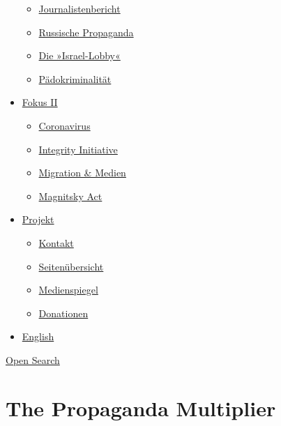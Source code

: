 \begin{itemize}
  \begin{itemize}
  \tightlist
  \item
    \href{https://swprs.org/bericht-eines-journalisten/}{Journalistenbericht}
  \item
    \href{https://swprs.org/russische-propaganda/}{Russische Propaganda}
  \item
    \href{https://swprs.org/die-israel-lobby-fakten-und-mythen/}{Die
    »Israel-Lobby«}
  \item
    \href{https://swprs.org/geopolitik-und-paedokriminalitaet/}{Pädokriminalität}
  \end{itemize}
\item
  \href{https://swprs.org/migration-und-medien/}{Fokus II}

  \begin{itemize}
  \tightlist
  \item
    \href{https://swprs.org/covid-19-hinweis-ii/}{Coronavirus}
  \item
    \href{https://swprs.org/die-integrity-initiative/}{Integrity
    Initiative}
  \item
    \href{https://swprs.org/migration-und-medien/}{Migration \& Medien}
  \item
    \href{https://swprs.org/der-fall-magnitsky/}{Magnitsky Act}
  \end{itemize}
\item
  \href{https://swprs.org/kontakt/}{Projekt}

  \begin{itemize}
  \tightlist
  \item
    \href{https://swprs.org/kontakt/}{Kontakt}
  \item
    \href{https://swprs.org/uebersicht/}{Seitenübersicht}
  \item
    \href{https://swprs.org/medienspiegel/}{Medienspiegel}
  \item
    \href{https://swprs.org/donationen/}{Donationen}
  \end{itemize}
\item
  \href{https://swprs.org/contact/}{English}
\end{itemize}

\protect\hyperlink{}{Open Search}

\hypertarget{the-propaganda-multiplier}{%
\section{The Propaganda Multiplier}\label{the-propaganda-multiplier}}

